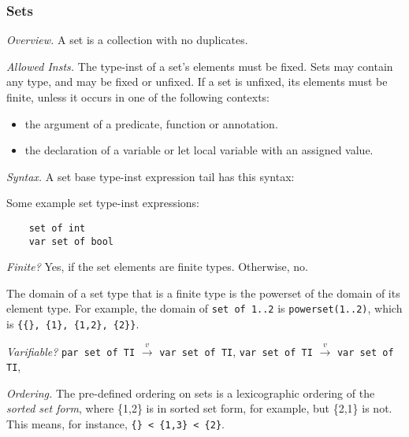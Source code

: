 \documentclass[10pt]{scrartcl}
\newcommand{\pjs}[1]{\textcolor{blue}{PJS:#1}}
\newcommand{\TyThing}[1]{\vspace{1.2mm}\noindent\emph{#1} }
\newcommand{\TyOverview}{\TyThing{Overview.}}
\newcommand{\TyInsts}{\TyThing{Allowed Insts.}}
\newcommand{\TySyntax}{\TyThing{Syntax.}}
\newcommand{\TyFiniteType}{\TyThing{Finite?}}
\newcommand{\TyVarifiable}{\TyThing{Varifiable?}}
\newcommand{\TyOrdering}{\TyThing{Ordering.}}
\newcommand{\varify}[2]{#1 $\stackrel{v}{\rightarrow}$ #2}
\begin{document}
\subsubsection{Sets}
        \label{Sets}
\TyOverview
A set is a collection with no duplicates.

\TyInsts
The type-inst of a set's elements must be fixed.  
Sets may contain any type, and may be fixed or unfixed.
If a set is unfixed, its elements must be finite, unless it occurs in one
of the following contexts:
\begin{itemize}
\item the argument of a predicate, function or annotation.
\item the declaration of a variable or let local variable with an
      assigned value.
\end{itemize}

\TySyntax
A set base type-inst expression tail has this syntax:
\begin{productions}
    \RuleSetTIExprTail
\end{productions}
Some example set type-inst expressions:
\begin{verbatim}
    set of int
    var set of bool
\end{verbatim}

\TyFiniteType
Yes, if the set elements are finite types.  Otherwise, no.

The domain of a set type that is a finite type is the powerset of the domain
of its element type.  For example, the domain of \texttt{set of 1..2} is
\texttt{powerset(1..2)}, which is \verb+{{}, {1}, {1,2}, {2}}+.

\TyVarifiable
\varify{\texttt{par set of TI}}{\texttt{var set of TI}},
\varify{\texttt{var set of TI}}{\texttt{var set of TI}},

\TyOrdering
%
The pre-defined ordering on sets is a lexicographic ordering of the
\emph{sorted set form}, where \{1,2\} is in sorted set form, for example,
but \{2,1\} is not.
This means, for instance, \verb'{} < {1,3} < {2}'.
\end{document}
